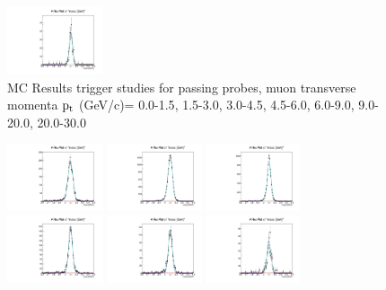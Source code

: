 \documentclass{article}
\begin{document}
\begin{figure}
    \includegraphics[width=0.25\textwidth]{../PlotsRooFitMC/croofit_trg_pass_6.pdf}
    \caption{MC Results trigger studies for passing probes, muon transverse momenta
    $\rm p_{t}$ (GeV/c)= {0.0-1.5}, {1.5-3.0}, {3.0-4.5}, {4.5-6.0}, 
    {6.0-9.0}, {9.0-20.0}, {20.0-30.0}}
\end{figure}

\begin{figure}
    \includegraphics[width=0.25\textwidth]{../PlotsRooFitMC/croofit_trg_fail_0.pdf}
    \includegraphics[width=0.25\textwidth]{../PlotsRooFitMC/croofit_trg_fail_1.pdf}
    \includegraphics[width=0.25\textwidth]{../PlotsRooFitMC/croofit_trg_fail_2.pdf}
    \includegraphics[width=0.25\textwidth]{../PlotsRooFitMC/croofit_trg_fail_3.pdf}
    \includegraphics[width=0.25\textwidth]{../PlotsRooFitMC/croofit_trg_fail_4.pdf}
    \includegraphics[width=0.25\textwidth]{../PlotsRooFitMC/croofit_trg_fail_5.pdf}

\end{figure}
\end{document}
